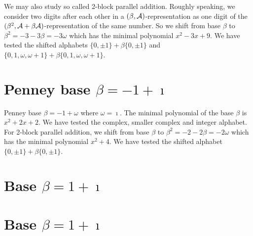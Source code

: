 



We may also study so called 2-block parallel addition. Roughly speaking, we consider two digits after each other in a $(\beta,\mathcal{A})$-representation as one digit of the $(\beta^2,\mathcal{A}+\beta\mathcal{A})$-representation of the same number. So we shift from base $\beta$ to $\beta^2=-3-3\beta=-3\omega$ which has the minimal polynomial $x^2-3x+9$. We have tested the shifted alphabets $\{0,\pm 1\}+\beta \{0,\pm 1\}$ and $\{0,1, \omega, \omega +1\}+\beta \{0,1, \omega, \omega +1\}$.
  



\section{\texorpdfstring{Penney base $\beta = -1 + \imath$}{Penney base beta = -1 + i}}
Penney base $\beta = -1 + \omega$ where $\omega=\imath$. The minimal polynomial of the base $\beta$ is $x^2 + 2x+2$. We have tested the complex, smaller complex and integer alphabet.
% 
% 
% 
For 2-block parallel addition, we shift from base $\beta$ to $\beta^2=-2-2\beta=-2\omega$ which has the minimal polynomial $x^{2} + 4$. We have tested the shifted alphabet $\{0,\pm 1\}+\beta \{0,\pm 1\}$.
% 

\section{\texorpdfstring{Base $\beta = 1 + \imath$}{Base beta = 1 + i}}
% 
% 
% 
% 
% 
% 
% 
% 
% 
% 
% 
\section{\texorpdfstring{Base $\beta = 1 + \imath$}{Base beta = 1 + i}}
% 